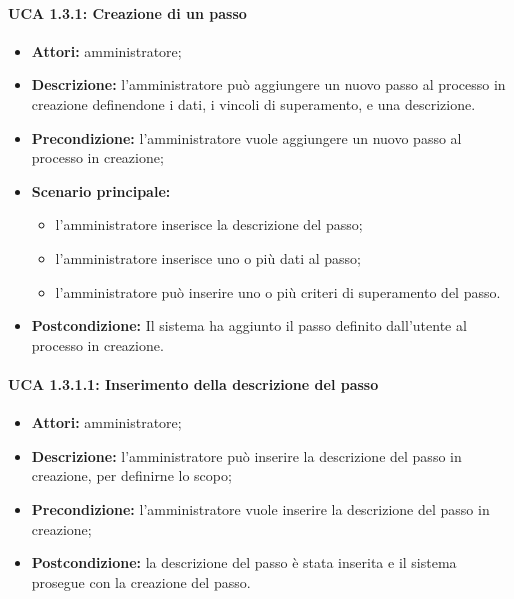 \paragraph{UCA 1.3.1: Creazione di un passo}
\begin{itemize}
\item \textbf{Attori:} 
amministratore;
\item \textbf{Descrizione:} 
l'amministratore può aggiungere un nuovo passo al processo in creazione definendone i dati, i vincoli di superamento, e una descrizione.
\item \textbf{Precondizione:} 
l'amministratore vuole aggiungere un nuovo passo al processo in creazione;
\item \textbf{Scenario principale:} 
\begin{itemize}
\item l'amministratore inserisce la descrizione del passo;
\item l'amministratore inserisce uno o più dati al passo;
\item l'amministratore può inserire uno o più criteri di superamento del passo.
\end{itemize}
\item \textbf{Postcondizione:}
Il sistema ha aggiunto il passo definito dall'utente al processo in creazione.
\end{itemize}

\paragraph{UCA 1.3.1.1: Inserimento della descrizione del passo}
\begin{itemize}
\item \textbf{Attori:} 
amministratore;
\item \textbf{Descrizione:} 
l'amministratore può inserire la descrizione del passo in creazione, per definirne lo scopo;
\item \textbf{Precondizione:} 
l'amministratore vuole inserire la descrizione del passo in creazione;
\item \textbf{Postcondizione:}
la descrizione del passo è stata inserita e il sistema prosegue con la creazione del passo.
\end{itemize}

